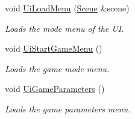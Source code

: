 \begin{DoxyCompactItemize}
void \hyperlink{class_user_interface_accd4f214f0fd8c55b36546e73a11d45d}{Ui\+Load\+Menu} (\hyperlink{class_scene}{Scene} \&scene)
\begin{DoxyCompactList}\small\item\em Loads the mode menu of the UI. \end{DoxyCompactList}\item 
void \hyperlink{class_user_interface_aec5f0cf032066ab142d244bfc9735ae6}{Ui\+Start\+Game\+Menu} ()
\begin{DoxyCompactList}\small\item\em Loads the game mode menu. \end{DoxyCompactList}\item 
void \hyperlink{class_user_interface_a4fa32deeece39dc97a231d7add5123d2}{Ui\+Game\+Parameters} ()
\begin{DoxyCompactList}\small\item\em Loads the game parameters menu. \end{DoxyCompactList}\end{DoxyCompactItemize}

